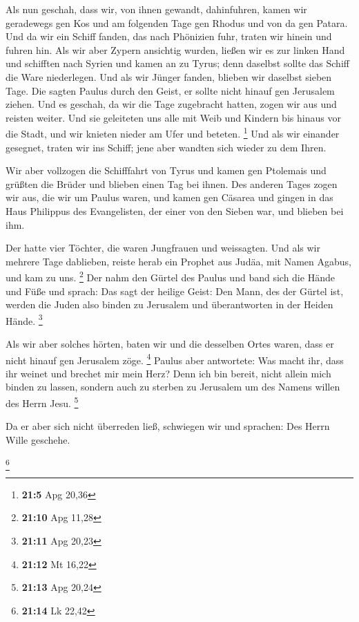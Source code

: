 Als nun geschah, dass wir, von ihnen gewandt,
dahinfuhren, kamen wir geradewegs gen Kos und am folgenden Tage gen
Rhodus und von da gen Patara.  Und da wir ein Schiff
fanden, das nach Phönizien fuhr, traten wir hinein und fuhren hin.
 Als wir aber Zypern ansichtig wurden, ließen wir es zur
linken Hand und schifften nach Syrien und kamen an zu Tyrus; denn
daselbst sollte das Schiff die Ware niederlegen.  Und als
wir Jünger fanden, blieben wir daselbst sieben Tage. Die sagten Paulus
durch den Geist, er sollte nicht hinauf gen Jerusalem ziehen.
 Und es geschah, da wir die Tage zugebracht hatten, zogen
wir aus und reisten weiter. Und sie geleiteten uns alle mit Weib und
Kindern bis hinaus vor die Stadt, und wir knieten nieder am Ufer und
beteten. \footnote{\textbf{21:5} Apg 20,36}  Und als wir
einander gesegnet, traten wir ins Schiff; jene aber wandten sich wieder
zu dem Ihren.

 Wir aber vollzogen die Schifffahrt von Tyrus und kamen
gen Ptolemais und grüßten die Brüder und blieben einen Tag bei ihnen.
 Des anderen Tages zogen wir aus, die wir um Paulus waren,
und kamen gen Cäsarea und gingen in das Haus Philippus des Evangelisten,
der einer von den Sieben war, und blieben bei ihm.

 Der hatte vier Töchter, die waren Jungfrauen und
weissagten.  Und als wir mehrere Tage dablieben, reiste
herab ein Prophet aus Judäa, mit Namen Agabus, und kam zu uns.
\footnote{\textbf{21:10} Apg 11,28}  Der nahm den Gürtel
des Paulus und band sich die Hände und Füße und sprach: Das sagt der
heilige Geist: Den Mann, des der Gürtel ist, werden die Juden also
binden zu Jerusalem und überantworten in der Heiden Hände. \footnote{\textbf{21:11}
  Apg 20,23}

 Als wir aber solches hörten, baten wir und die desselben
Ortes waren, dass er nicht hinauf gen Jerusalem zöge. \footnote{\textbf{21:12}
  Mt 16,22}  Paulus aber antwortete: Was macht ihr, dass
ihr weinet und brechet mir mein Herz? Denn ich bin bereit, nicht allein
mich binden zu lassen, sondern auch zu sterben zu Jerusalem um des
Namens willen des Herrn Jesu. \footnote{\textbf{21:13} Apg 20,24}

 Da er aber sich nicht überreden ließ, schwiegen wir und
sprachen: Des Herrn Wille geschehe.

\footnote{\textbf{21:14} Lk 22,42}

